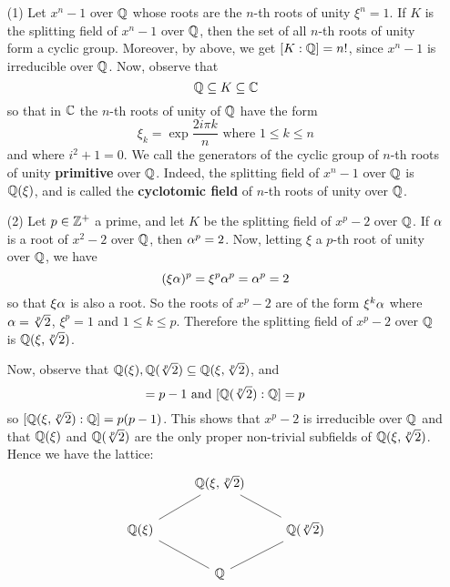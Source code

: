 \begin{example}\label{example_8.13}
  \begin{enumerate}
    \item[(1)] Let $x^n-1$ over $\mathbb{Q}$ whose roots are the $n$-th roots
      of unity $\xi^n=1$. If  $K$ is the splitting field of  $x^n-1$
      over $\mathbb{Q}$, then the set of all $n$-th roots of unity form a
      cyclic group. Moreover, by above, we get $[K:\mathbb{Q}]=n!$, since
      $x^n-1$ is irreducible
      over  $\mathbb{Q}$. Now, observe that
      \begin{equation*}
        \mathbb{Q} \subseteq K \subseteq \mathbb{C}
      \end{equation*}
      so that in $\mathbb{C}$ the $n$-th roots of unity of $\mathbb{Q}$ have the form
      \begin{equation*}
        \xi_k=\exp{\frac{2i\pi{k}}{n}} \text{ where } 1 \leq k \leq n
      \end{equation*}
      and where $i^2+1=0$. We call the generators of the cyclic group of
      $n$-th roots of unity  \textbf{primitive} over  $\mathbb{Q}$. Indeed, the
      splitting field of $x^n-1$ over $\mathbb{Q}$ is $\mathbb{Q}(\xi)$, and is called the
      \textbf{cyclotomic field} of $n$-th roots of unity over $\mathbb{Q}$.

    \item[(2)] Let $p \in \mathbb{Z}^+$ a prime, and let $K$ be the splitting
      field of  $x^p-2$ over $\mathbb{Q}$. If $\alpha$ is a root of  $x^2-2$ over
      $\mathbb{Q}$, then  $\alpha^p=2$. Now, letting $\xi$ a $p$-th root of unity
      over $\mathbb{Q}$, we have
      \begin{equation*}
        (\xi\alpha)^p=\xi^p\alpha^p=\alpha^p=2
      \end{equation*}
      so that $\xi\alpha$ is also a root. So the roots of  $x^p-2$ are of
      the form $\xi^k\alpha$ where $\alpha=\sqrt[p]{2}$, $\xi^p=1$ and $1
      \leq k \leq p$. Therefore the splitting field of $x^p-2$ over
      $\mathbb{Q}$ is  $\mathbb{Q}(\xi, \sqrt[p]{2})$.

      Now, observe that $\mathbb{Q}(\xi),\mathbb{Q}(\sqrt[p]{2}) \subseteq
      \mathbb{Q}(\xi, \sqrt[p]{2})$, and
      \begin{equation*}
        [\Q(\xi):\Q]=p-1 \text{ and } [\Q(\sqrt[p]{2}):\Q]=p
      \end{equation*}
      so $[\mathbb{Q}(\xi, \sqrt[p]{2}):\mathbb{Q}]=p(p-1)$. This shows that $x^p-2$
      is irreducible over $\mathbb{Q}$ and that $\mathbb{Q}(\xi)$ and
      $\mathbb{Q}(\sqrt[p]{2})$ are the only proper non-trivial subfields of
      $\mathbb{Q}(\xi,\sqrt[p]{2})$. Hence we have the lattice:
      \[\begin{tikzcd}
  & {\Q(\xi, \sqrt[p]{2})} \\
        {\Q(\xi)} && {\Q(\sqrt[p]{2})} \\
                  & \Q
                  \arrow[no head, from=2-1, to=1-2]
                  \arrow[no head, from=2-3, to=1-2]
                  \arrow[no head, from=3-2, to=2-1]
                  \arrow[no head, from=3-2, to=2-3]
      \end{tikzcd}\]
  \end{enumerate}
\end{example}

